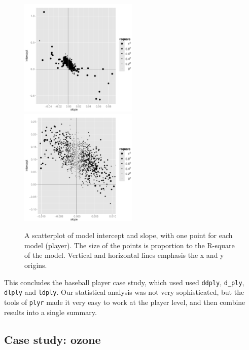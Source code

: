 \documentclass{scrartcl}
\begin{document}
\begin{figure}[htbp]
  \centering
    \includegraphics[width=0.5\textwidth]{models}%
    \includegraphics[width=0.5\textwidth]{models-zoom}
  \caption{A scatterplot of model intercept and slope, with one point for each model (player).  The size of the points is proportion to the R-square of the model. Vertical and horizontal lines emphasis the x and y origins. }
  \label{fig:models}
\end{figure}

This concludes the baseball player case study, which used used {\tt ddply}, {\tt d\_ply}, {\tt dlply} and {\tt ldply}.  Our statistical analysis was not very sophisticated, but the tools of {\tt plyr} made it very easy to work at the player level, and then combine results into a single summary.  

\subsection{Case study: ozone}
\label{sub:ozone}
\end{document}
